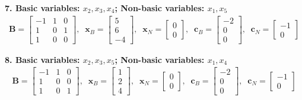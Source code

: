 \documentclass[11pt]{article}
\newcommand{\mb}[1]{\ensuremath{\boldsymbol{#1}}}
\begin{document}
\begin{enumerate}
\begin{enumerate}
		\textbf{7. Basic variables: $x_2, x_3, x_4$; Non-basic variables: $x_1, x_5$}
		\begin{align*}
		\mb{B} = \begin{bmatrix} -1 & 1 & 0 \\ 1 & 0 & 1 \\ 1 & 0 & 0 \end{bmatrix}, \;\; 
		\mb{x}_B = \begin{bmatrix} 5 \\ 6 \\ -4 \end{bmatrix}, \;\; 
		\mb{x}_N = \begin{bmatrix} 0 \\ 0 \end{bmatrix}, \;\; 
		\mb{c}_B = \begin{bmatrix} -2 \\ 0 \\ 0 \end{bmatrix}, \;\; 
		\mb{c}_N = \begin{bmatrix} -1 \\ 0 \end{bmatrix}
		\end{align*}
		
		\textbf{8. Basic variables: $x_2, x_3, x_5$; Non-basic variables: $x_1, x_4$}
		\begin{align*}
		\mb{B} = \begin{bmatrix} -1 & 1 & 0 \\ 1 & 0 & 0 \\ 1 & 0 & 1 \end{bmatrix}, \;\; 
		\mb{x}_B = \begin{bmatrix} 1 \\ 2 \\ 4 \end{bmatrix}, \;\; 
		\mb{x}_N = \begin{bmatrix} 0 \\ 0 \end{bmatrix}, \;\; 
		\mb{c}_B = \begin{bmatrix} -2 \\ 0 \\ 0 \end{bmatrix}, \;\; 
		\mb{c}_N = \begin{bmatrix} -1 \\ 0 \end{bmatrix}
		\end{align*}
		

\end{enumerate}
\end{enumerate}
\end{document}
